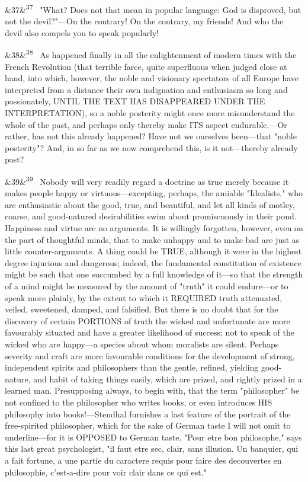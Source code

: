 \documentclass[12pt]{article}
\newcommand{\para}[1][]{\par\noindent\ifx&#1&\else\textsuperscript{\footnotesize #1}~\fi}
\begin{document}
\para[37] "What? Does not that mean in popular language: God is disproved, but not the devil?"---On the contrary! On the contrary, my friends! And who the devil also compels you to speak popularly!

\para[38] As happened finally in all the enlightenment of modern times with the French Revolution (that terrible farce, quite superfluous when judged close at hand, into which, however, the noble and visionary spectators of all Europe have interpreted from a distance their own indignation and enthusiasm so long and passionately, UNTIL THE TEXT HAS DISAPPEARED UNDER THE INTERPRETATION), so a noble posterity might once more misunderstand the whole of the past, and perhaps only thereby make ITS aspect endurable.---Or rather, has not this already happened? Have not we ourselves been---that "noble posterity"? And, in so far as we now comprehend this, is it not---thereby already past?

\para[39] Nobody will very readily regard a doctrine as true merely because it makes people happy or virtuous---excepting, perhaps, the amiable "Idealists," who are enthusiastic about the good, true, and beautiful, and let all kinds of motley, coarse, and good-natured desirabilities swim about promiscuously in their pond. Happiness and virtue are no arguments. It is willingly forgotten, however, even on the part of thoughtful minds, that to make unhappy and to make bad are just as little counter-arguments. A thing could be TRUE, although it were in the highest degree injurious and dangerous; indeed, the fundamental constitution of existence might be such that one succumbed by a full knowledge of it---so that the strength of a mind might be measured by the amount of "truth" it could endure---or to speak more plainly, by the extent to which it REQUIRED truth attenuated, veiled, sweetened, damped, and falsified. But there is no doubt that for the discovery of certain PORTIONS of truth the wicked and unfortunate are more favourably situated and have a greater likelihood of success; not to speak of the wicked who are happy---a species about whom moralists are silent. Perhaps severity and craft are more favourable conditions for the development of strong, independent spirits and philosophers than the gentle, refined, yielding good-nature, and habit of taking things easily, which are prized, and rightly prized in a learned man. Presupposing always, to begin with, that the term "philosopher" be not confined to the philosopher who writes books, or even introduces HIS philosophy into books!---Stendhal furnishes a last feature of the portrait of the free-spirited philosopher, which for the sake of German taste I will not omit to underline---for it is OPPOSED to German taste. "Pour etre bon philosophe," says this last great psychologist, "il faut etre sec, clair, sans illusion. Un banquier, qui a fait fortune, a une partie du caractere requis pour faire des decouvertes en philosophie, c'est-a-dire pour voir clair dans ce qui est."
\end{document}
